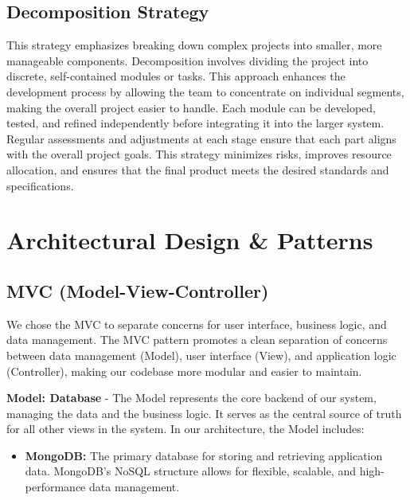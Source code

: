 \documentclass[11pt,a4paper]{article}
\begin{document}
\subsection*{Decomposition Strategy}
This strategy emphasizes breaking down complex projects into smaller, more manageable components. Decomposition involves dividing the project into discrete, self-contained modules or tasks. This approach enhances the development process by allowing the team to concentrate on individual segments, making the overall project easier to handle. Each module can be developed, tested, and refined independently before integrating it into the larger system. Regular assessments and adjustments at each stage ensure that each part aligns with the overall project goals. This strategy minimizes risks, improves resource allocation, and ensures that the final product meets the desired standards and specifications.

\pagebreak

\section*{Architectural Design \& Patterns}
\subsection*{MVC (Model-View-Controller)}
We chose the MVC to separate concerns for user interface, business logic, and data management. The MVC pattern promotes a clean separation of concerns between data management (Model), user interface (View), and application logic (Controller), making our codebase more modular and easier to maintain.

\textbf{Model: Database} - The Model represents the core backend of our system, managing the data and the business logic. It serves as the central source of truth for all other views in the system. In our architecture, the Model includes:
\begin{itemize}
    \item \textbf{MongoDB:} The primary database for storing and retrieving application data. MongoDB's NoSQL structure allows for flexible, scalable, and high-performance data management.
\end{itemize}
\end{document}
